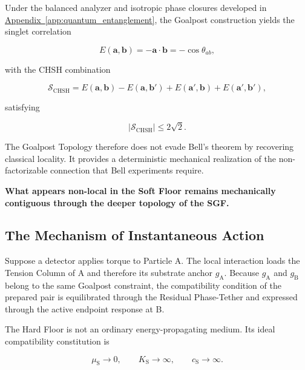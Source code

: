 Under the balanced analyzer and isotropic phase closures developed in
\hyperref[app:quantum_entanglement]{Appendix~\ref*{app:quantum_entanglement}},
the Goalpost construction yields the singlet correlation

\begin{equation}
    E(\mathbf a,\mathbf b)
    =
    -\mathbf a\cdot\mathbf b
    =
    -\cos\theta_{ab},
    \label{eq:goalpost_singlet}
\end{equation}

with the CHSH combination

\begin{equation}
    \mathcal S_{\mathrm{CHSH}}
    =
    E(\mathbf a,\mathbf b)
    -
    E(\mathbf a,\mathbf b')
    +
    E(\mathbf a',\mathbf b)
    +
    E(\mathbf a',\mathbf b'),
\end{equation}

satisfying

\begin{equation}
    \left|
        \mathcal S_{\mathrm{CHSH}}
    \right|
    \leq
    2\sqrt{2}.
    \label{eq:bell_chsh_unstrained}
\end{equation}

The Goalpost Topology therefore does not evade Bell's theorem by recovering classical locality. It provides a deterministic mechanical realization of the non-factorizable connection that Bell experiments require.

\textbf{What appears non-local in the Soft Floor remains mechanically contiguous through the deeper topology of the SGF.}

\subsection{The Mechanism of Instantaneous Action}
\label{sec:instantaneous_action}

Suppose a detector applies torque to Particle A. The local interaction loads the Tension Column of A and therefore its substrate anchor $g_{\mathrm A}$. Because $g_{\mathrm A}$ and $g_{\mathrm B}$ belong to the same Goalpost constraint, the compatibility condition of the prepared pair is equilibrated through the Residual Phase-Tether and expressed through the active endpoint response at B.

The Hard Floor is not an ordinary energy-propagating medium. Its ideal compatibility constitution is

\begin{equation}
    \mu_{\mathrm S}\longrightarrow0,
    \qquad
    K_{\mathrm S}\longrightarrow\infty,
    \qquad
    c_{\mathrm S}\longrightarrow\infty.
    \label{eq:hard_floor_compatibility}
\end{equation}

